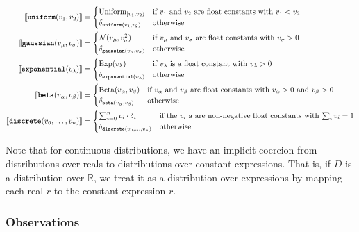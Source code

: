 \begin{align*}
\sem{ \uniform(v_1, v_2) } &= \begin{cases}
\text{Uniform}_{[v_1, v_2)}  & \text{if $v_1$ and $v_2$ are float constants with $v_1 < v_2$} \\
%
\delta_{\uniform(v_1, v_2)} & \text{otherwise}
\end{cases}
\\
\sem{ \gaussian(v_\mu, v_\sigma) } &= 
 \begin{cases}
	\mathcal{N}(v_\mu, v_\sigma^2)  & \text{if $v_\mu$ and $v_\sigma$ are float constants with $v_\sigma > 0$} \\
	\delta_{\gaussian(v_\mu, v_\sigma)} & \text{otherwise}
\end{cases}
\\
\sem{ \exponential(v_\lambda) } &= 
 \begin{cases}
	\text{Exp}(v_\lambda)   & \text{if $v_\lambda$ is a float constant with $v_\lambda > 0$} \\
	\delta_{\exponential(v_\lambda)} & \text{otherwise}
\end{cases}
\\
\sem{ \betafn(v_\alpha, v_\beta) } &= 
 \begin{cases}
	\text{Beta}(v_\alpha, v_\beta)   & \text{if $v_\alpha$ and $v_\beta$ are float constants with $v_\alpha > 0$ and $v_\beta > 0$} \\
	\delta_{\betafn(v_\alpha, v_\beta)} & \text{otherwise}
\end{cases}
\\
\sem{ \discrete(v_0, \ldots, v_n) } &= %
\begin{cases}
	\sum_{i=0}^n v_i \cdot \delta_i & \text{if the $v_i$ a are non-negative float constants with $\sum_i v_i = 1$} \\
	\delta_{\discrete(v_0, \ldots, v_n)}  & \text{otherwise}
\end{cases}
\end{align*}

Note that for continuous distributions, we have an implicit coercion from distributions over reals to distributions over constant expressions. That is, if $D$ is a distribution over $\mathbb{R}$, we treat it as a distribution over expressions by mapping each real $r$ to the constant expression $r$.

\subsubsection{Observations}

